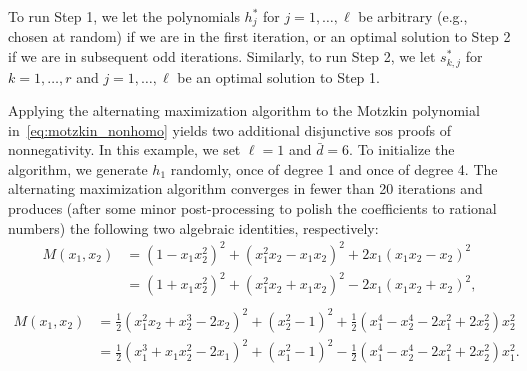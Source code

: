 \documentclass[12pt]{article}
\theoremstyle{remark}
\begin{document}
To run Step 1, we let the polynomials $h_j^*$ for ${j}=1,\ldots, \ell$ be arbitrary (e.g., chosen at random) if we are in the first iteration, or an optimal solution to Step 2 if we are in subsequent odd iterations. Similarly, to run Step 2, we let $s_{k,j}^*$ for $k=1,\ldots,r$ and $j=1,\ldots,\ell$ be an optimal solution to Step 1.






Applying the alternating maximization algorithm to the Motzkin polynomial in~\eqref{eq:motzkin_nonhomo} yields two additional disjunctive sos proofs of nonnegativity. In this example, we set $\ell=1$ and $\bar{d}=6$. To initialize the algorithm, we generate $h_1$ randomly, once of degree 1 and once of degree 4. The alternating maximization algorithm converges in fewer than 20 iterations and produces (after some minor post-processing to polish the coefficients to rational numbers) the following two algebraic identities, respectively: 
\begin{equation}\label{eq:Motzkin.disos.proof2}
 \begin{aligned}
    M(x_1,x_2) &= (1-x_1x_2^2)^2 + (x_1^2x_2-x_1x_2)^2 + 2x_1(x_1x_2-x_2)^2\\
    & = (1+x_1x_2^2)^2 + (x_1^2x_2+x_1x_2)^2 - 2x_1(x_1x_2+x_2)^2,\\
\end{aligned} 
\end{equation}
\begin{equation}\label{eq:Motzkin.disos.proof3}
 \begin{aligned}
M(x_1,x_2) &= \frac{1}{2}(x_1^2x_2+x_2^3-2x_2)^2 + (x_2^2-1)^2  +\frac{1}{2}(x_1^4-x_2^4-2x_1^2+2x_2^2)x_2^2\\
  &=\frac{1}{2}(x_1^3+x_1x_2^2-2x_1)^2 + (x_1^2-1)^2 - \frac{1}{2}(x_1^4-x_2^4-2x_1^2+2x_2^2)x_1^2.
\end{aligned} 
\end{equation}
\end{document}
